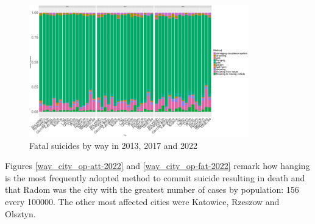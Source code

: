 \documentclass{article}
\begin{document}
\begin{figure}[H]
    \centering
    \includegraphics[width=0.85\textwidth]{imgs/way_city_fat_suicides-131722.pdf}
    \caption{Fatal suicides by way  in 2013, 2017 and 2022}
    \label{way_city_fat_suicides-131722}
\end{figure}
Figures \ref{way_city_op-att-2022} and \ref{way_city_op-fat-2022}
remark how hanging is the most frequently adopted method to commit suicide resulting
in death and that Radom was the city with the greatest number of cases by population: 156 every 100000.
The other most affected cities were Katowice, Rzeszow and Olsztyn.
\end{document}
